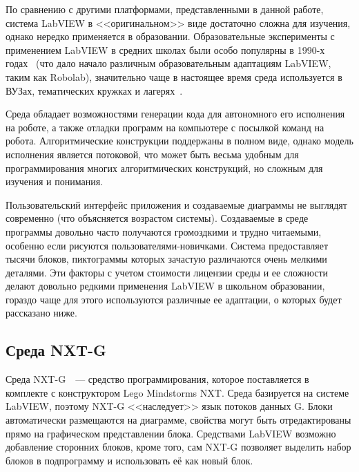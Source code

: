 \documentclass[a5paper]{article}
\begin{document}
По сравнению с другими платформами, представленными в данной работе, система LabVIEW в <<оригинальном>> виде 
достаточно сложна для изучения, однако нередко применяется в образовании. Образовательные эксперименты с 
применением LabVIEW в средних школах были особо популярны в 1990-х годах~\cite{cyr1997low} (что дало начало различным 
образовательным адаптациям LabVIEW, таким как Robolab), значительно чаще в настоящее время среда используется 
в ВУЗах, тематических кружках и лагерях~\cite{stefanovic2011labview}.

Среда обладает возможностями генерации кода для автономного его исполнения на роботе, а также отладки программ 
на компьютере с посылкой команд на робота. Алгоритмические конструкции поддержаны в полном виде, однако модель 
исполнения является потоковой, что может быть весьма удобным для программирования многих алгоритмических 
конструкций, но сложным для изучения и понимания.

Пользовательский интерфейс приложения и создаваемые диаграммы не выглядят современно (что объясняется возрастом 
системы). Создаваемые в среде программы довольно часто получаются громоздкими и трудно читаемыми, особенно 
если рисуются пользователями-новичками. Система предоставляет тысячи блоков, пиктограммы которых зачастую 
различаются очень мелкими деталями. Эти факторы с учетом стоимости лицензии среды и ее сложности делают 
довольно редкими применения LabVIEW в школьном образовании, гораздо чаще для этого используются различные 
ее адаптации, о которых будет рассказано ниже.

\subsection{Среда NXT-G}

Среда NXT-G~\cite{kelly2010lego}~--- средство программирования, которое поставляется в комплекте 
с конструктором Lego Mindstorms NXT. Среда базируется на системе LabVIEW, поэтому 
NXT-G <<наследует>> язык потоков данных G. Блоки автоматически 
размещаются на диаграмме, свойства могут быть отредактированы прямо на графическом представлении блока. 
Средствами LabVIEW возможно добавление сторонних блоков, кроме того, сам NXT-G позволяет выделить набор 
блоков в подпрограмму и использовать её как новый блок.
\end{document}
